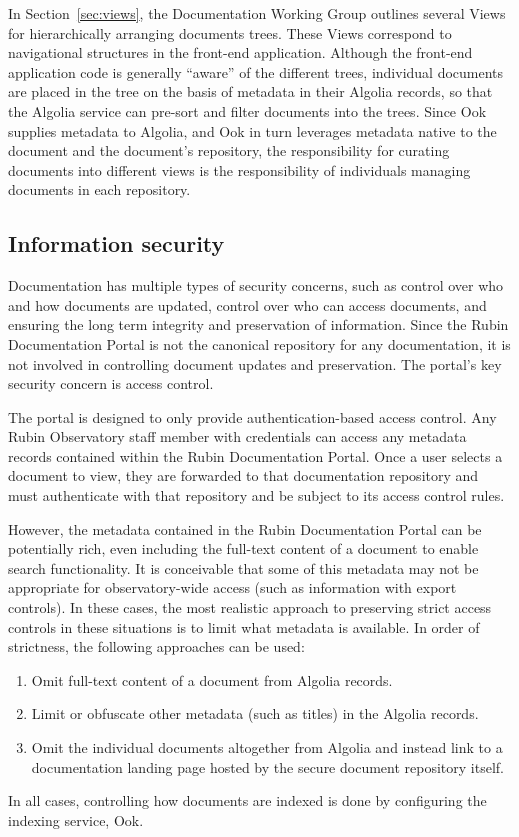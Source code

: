 In Section~\ref{sec:views}, the Documentation Working Group outlines several Views for hierarchically arranging documents trees.
These Views correspond to navigational structures in the front-end application.
Although the front-end application code is generally ``aware'' of the different trees, individual documents are placed in the tree on the basis of metadata in their Algolia records, so that the Algolia service can pre-sort and filter documents into the trees.
Since Ook supplies metadata to Algolia, and Ook in turn leverages metadata native to the document and the document's repository, the responsibility for curating documents into different views is the responsibility of individuals managing documents in each repository.

\subsection{Information security}

Documentation has multiple types of security concerns, such as control over who and how documents are updated, control over who can access documents, and ensuring the long term integrity and preservation of information.
Since the Rubin Documentation Portal is not the canonical repository for any documentation, it is not involved in controlling document updates and preservation.
The portal's key security concern is access control.

The portal is designed to only provide authentication-based access control.
Any Rubin Observatory staff member with credentials can access any metadata records contained within the Rubin Documentation Portal.
Once a user selects a document to view, they are forwarded to that documentation repository and must authenticate with that repository and be subject to its access control rules.

However, the metadata contained in the Rubin Documentation Portal can be potentially rich, even including the full-text content of a document to enable search functionality.
It is conceivable that some of this metadata may not be appropriate for observatory-wide access (such as information with export controls).
In these cases, the most realistic approach to preserving strict access controls in these situations is to limit what metadata is available.
In order of strictness, the following approaches can be used:

\begin{enumerate}
  \item Omit full-text content of a document from Algolia records.
  \item Limit or obfuscate other metadata (such as titles) in the Algolia records.
  \item Omit the individual documents altogether from Algolia and instead link to a documentation landing page hosted by the secure document repository itself.
\end{enumerate}

In all cases, controlling how documents are indexed is done by configuring the indexing service, Ook.

